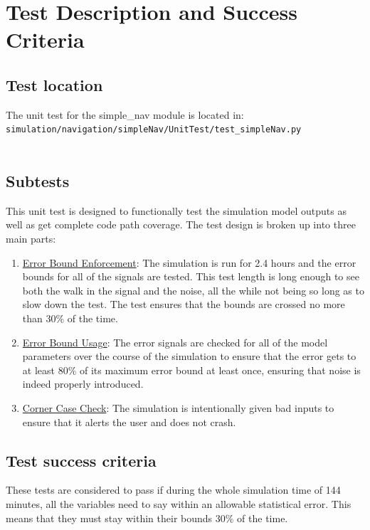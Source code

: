\section{Test Description and Success Criteria}


\subsection{Test location}

The unit test for the simple\_nav module is located in:\\

\noindent
{\tt simulation/navigation/simpleNav/UnitTest/test\_simpleNav.py} \\
\\

\subsection{Subtests}

\noindent This unit test is designed to functionally test the simulation model
outputs as well as get complete code path coverage.  The test design is broken
up into three main parts:\\
\begin{enumerate}
\item{\underline{Error Bound Enforcement}: The simulation is run for 2.4 hours and the
   error bounds for all of the signals are tested. This test length is long enough to see both
   the walk in the signal and the noise, all the while not being so long as to slow down the test.
   The test ensures that the bounds are crossed no more than 30\% of the time.}
\item{\underline{Error Bound Usage}: The error signals are checked for all of the model
   parameters over the course of the simulation to ensure that the error gets
   to at least 80\% of its maximum error bound at least once, ensuring that noise is indeed
   properly introduced.}
\item{\underline{Corner Case Check}: The simulation is intentionally given bad inputs to
   ensure that it alerts the user and does not crash.}
\end{enumerate}

\subsection{Test success criteria}

These tests are considered to pass if during the whole simulation time of 144 minutes,
all the variables need to say within an allowable statistical error. This means that they
must stay within their bounds $30\%$ of the time.

